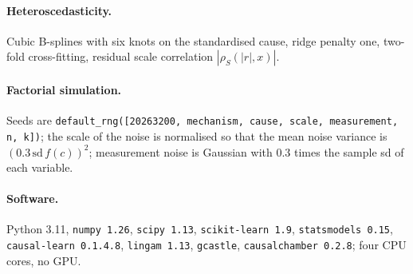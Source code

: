 \paragraph{Heteroscedasticity.} Cubic B-splines with six knots on the standardised cause, ridge penalty one, two-fold cross-fitting, residual scale correlation $|\rho_S(|r|,x)|$.
\paragraph{Factorial simulation.} Seeds are \texttt{default\_rng([20263200, mechanism, cause, scale, measurement, n, k])}; the scale of the noise is normalised so that the mean noise variance is $(0.3\,\mathrm{sd}\,f(c))^2$; measurement noise is Gaussian with $0.3$ times the sample sd of each variable.
\paragraph{Software.} Python 3.11, \texttt{numpy 1.26}, \texttt{scipy 1.13}, \texttt{scikit-learn 1.9}, \texttt{statsmodels 0.15}, \texttt{causal-learn 0.1.4.8}, \texttt{lingam 1.13}, \texttt{gcastle}, \texttt{causalchamber 0.2.8}; four CPU cores, no GPU.

